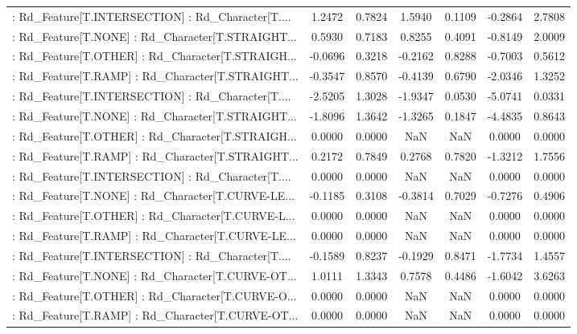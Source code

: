 \begin{longtable}{p{4cm}cccccc}
 : Rd\_Feature[T.INTERSECTION] : Rd\_Character[T.... &  1.2472 &    0.7824 &  1.5940 &       0.1109 & -0.2864 &  2.7808 \\
 : Rd\_Feature[T.NONE] : Rd\_Character[T.STRAIGHT... &  0.5930 &    0.7183 &  0.8255 &       0.4091 & -0.8149 &  2.0009 \\
 : Rd\_Feature[T.OTHER] : Rd\_Character[T.STRAIGH... & -0.0696 &    0.3218 & -0.2162 &       0.8288 & -0.7003 &  0.5612 \\
 : Rd\_Feature[T.RAMP] : Rd\_Character[T.STRAIGHT... & -0.3547 &    0.8570 & -0.4139 &       0.6790 & -2.0346 &  1.3252 \\
 : Rd\_Feature[T.INTERSECTION] : Rd\_Character[T.... & -2.5205 &    1.3028 & -1.9347 &       0.0530 & -5.0741 &  0.0331 \\
 : Rd\_Feature[T.NONE] : Rd\_Character[T.STRAIGHT... & -1.8096 &    1.3642 & -1.3265 &       0.1847 & -4.4835 &  0.8643 \\
 : Rd\_Feature[T.OTHER] : Rd\_Character[T.STRAIGH... &  0.0000 &    0.0000 &     NaN &          NaN &  0.0000 &  0.0000 \\
 : Rd\_Feature[T.RAMP] : Rd\_Character[T.STRAIGHT... &  0.2172 &    0.7849 &  0.2768 &       0.7820 & -1.3212 &  1.7556 \\
 : Rd\_Feature[T.INTERSECTION] : Rd\_Character[T.... &  0.0000 &    0.0000 &     NaN &          NaN &  0.0000 &  0.0000 \\
 : Rd\_Feature[T.NONE] : Rd\_Character[T.CURVE-LE... & -0.1185 &    0.3108 & -0.3814 &       0.7029 & -0.7276 &  0.4906 \\
 : Rd\_Feature[T.OTHER] : Rd\_Character[T.CURVE-L... &  0.0000 &    0.0000 &     NaN &          NaN &  0.0000 &  0.0000 \\
 : Rd\_Feature[T.RAMP] : Rd\_Character[T.CURVE-LE... &  0.0000 &    0.0000 &     NaN &          NaN &  0.0000 &  0.0000 \\
 : Rd\_Feature[T.INTERSECTION] : Rd\_Character[T.... & -0.1589 &    0.8237 & -0.1929 &       0.8471 & -1.7734 &  1.4557 \\
 : Rd\_Feature[T.NONE] : Rd\_Character[T.CURVE-OT... &  1.0111 &    1.3343 &  0.7578 &       0.4486 & -1.6042 &  3.6263 \\
 : Rd\_Feature[T.OTHER] : Rd\_Character[T.CURVE-O... &  0.0000 &    0.0000 &     NaN &          NaN &  0.0000 &  0.0000 \\
 : Rd\_Feature[T.RAMP] : Rd\_Character[T.CURVE-OT... &  0.0000 &    0.0000 &     NaN &          NaN &  0.0000 &  0.0000 \\

\end{longtable}

